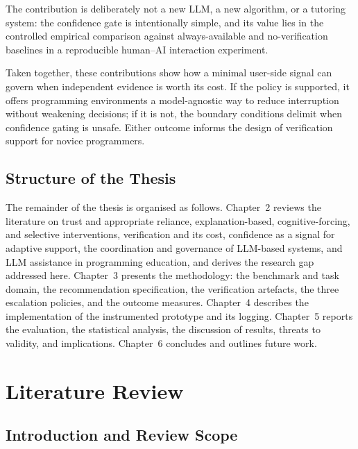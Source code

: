 \documentclass[oneside,final,14pt,a4paper]{extreport}
\begin{document}
The contribution is deliberately not a new LLM, a new algorithm, or a tutoring
system: the confidence gate is intentionally simple, and its value lies in the
controlled empirical comparison against always-available and no-verification
baselines in a reproducible human--AI interaction experiment.

Taken together, these contributions show how a minimal user-side signal can
govern when independent evidence is worth its cost. If the policy is supported,
it offers programming environments a model-agnostic way to reduce interruption
without weakening decisions; if it is not, the boundary conditions delimit when
confidence gating is unsafe. Either outcome informs the design of verification
support for novice programmers.

\section{Structure of the Thesis}
\label{sec:structure}

The remainder of the thesis is organised as follows.
Chapter~2 reviews the literature on trust and appropriate reliance,
explanation-based, cognitive-forcing, and selective interventions, verification
and its cost, confidence as a signal for adaptive support, the coordination and
governance of LLM-based systems, and LLM assistance in programming education, and
derives the research gap addressed here.
Chapter~3 presents the methodology: the benchmark and task domain, the
recommendation specification, the verification artefacts, the three escalation
policies, and the outcome measures.
Chapter~4 describes the implementation of the instrumented prototype and its
logging.
Chapter~5 reports the evaluation, the statistical analysis, the discussion of
results, threats to validity, and implications.
Chapter~6 concludes and outlines future work.


\chapter{Literature Review}
\label{chap:lr}

\section{Introduction and Review Scope}
\label{sec:lit-intro}
\end{document}
